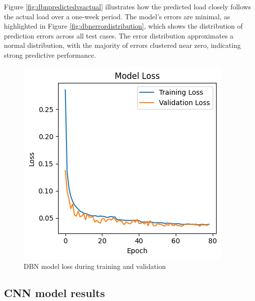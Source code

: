   Figure \ref{fig:dbnpredictedvsactual} illustrates how the predicted load closely follows the actual load over a one-week period. The model’s errors are minimal, as highlighted in Figure \ref{fig:dbnerrordistribution}, which shows the distribution of prediction errors across all test cases. The error distribution approximates a normal distribution, with the majority of errors clustered near zero, indicating strong predictive performance.   
  \begin{figure}[h!]
  	\centering
  	\includegraphics[width=0.4\linewidth]{"Chapters/images/results/dbn_validation loss"}
  	\caption{DBN model loss during training and validation}
  	\label{fig:dbnvalidation-loss}
  \end{figure}
  
 
 
 \subsection{CNN model results}
 
